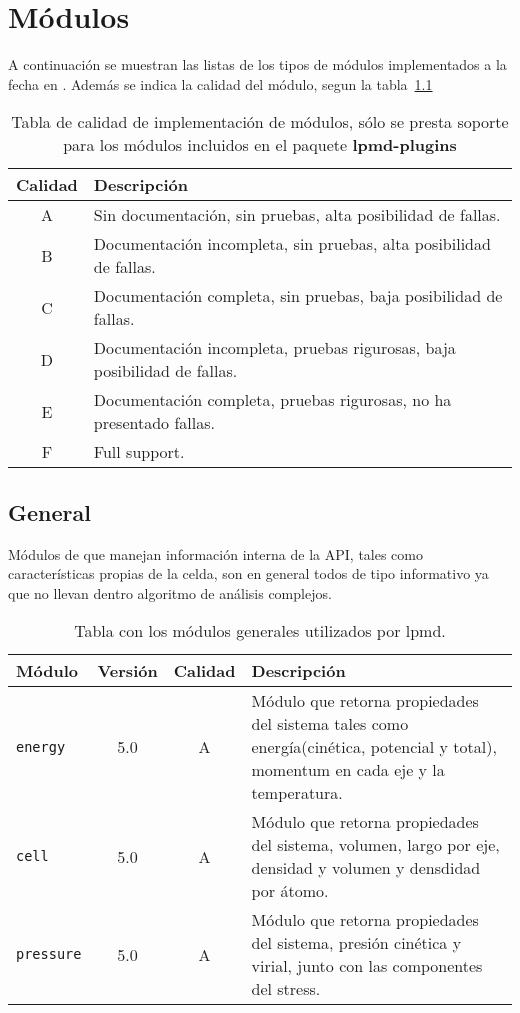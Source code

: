 \appendix

\chapter{M\'odulos}
A continuaci\'on se muestran las listas de los tipos de m\'odulos implementados a la fecha en {\lpmd}. Adem\'as se indica la calidad del m\'odulo, segun la tabla~\ref{tab:modquality}

\begin{table}[h!]
 \begin{tabular}{|c|l|}\hline\hline
 Calidad & Descripci\'on \\\hline\hline
 A & Sin documentaci\'on, sin pruebas, alta posibilidad de fallas. \\
 B & Documentaci\'on incompleta, sin pruebas, alta posibilidad de fallas. \\
 C & Documentaci\'on completa, sin pruebas, baja posibilidad de fallas. \\
 D & Documentaci\'on incompleta, pruebas rigurosas, baja posibilidad de fallas. \\
 E & Documentaci\'on completa, pruebas rigurosas, no ha presentado fallas. \\
 F & Full support. \\\hline\hline
 \end{tabular}
 \label{tab:modquality}
 \caption{Tabla de calidad de implementaci\'on de m\'odulos, s\'olo se presta soporte para los m\'odulos incluidos en el paquete \textbf{lpmd-plugins}}
\end{table}


\section{General}
M\'odulos de {\lpmd} que manejan informaci\'on interna de la API, tales como caracter\'isticas propias de la celda, son en general todos de tipo informativo ya que no llevan dentro algoritmo de an\'alisis complejos.

\begin{table}[h!]
\centering
 \begin{tabular}{|l|c|c|p{10cm}|}\hline
 M\'odulo & Versi\'on & Calidad & Descripci\'on \\
 \hline\hline
 \texttt{energy} & 5.0 & A & M\'odulo que retorna propiedades del sistema tales como energ\'ia(cin\'etica, potencial y total), momentum en cada eje y la temperatura.\\
 \hline
 \texttt{cell} & 5.0 & A & M\'odulo que retorna propiedades del sistema, volumen, largo por eje, densidad y volumen y densdidad por \'atomo. \\
 \hline
 \texttt{pressure} & 5.0 & A & M\'odulo que retorna propiedades del sistema, presi\'on cin\'etica y virial, junto con las componentes del stress. \\
 \hline
 \end{tabular}
\label{tab:modgeneral}
\caption{Tabla con los m\'odulos generales utilizados por lpmd.}
\end{table}

